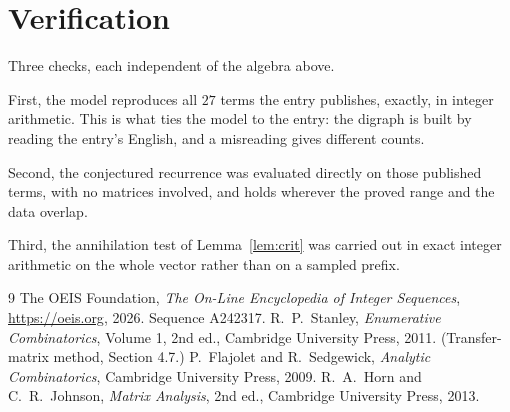 \documentclass[11pt,a4paper]{article}
\theoremstyle{plain}
\theoremstyle{definition}
\begin{document}
\section{Verification}

Three checks, each independent of the algebra above.

First, the model reproduces all $27$ terms the entry publishes, exactly, in integer
arithmetic. This is what ties the model to the entry: the digraph is built by reading the
entry's English, and a misreading gives different counts.

Second, the conjectured recurrence was evaluated directly on those published terms, with no
matrices involved, and holds wherever the proved range and the data overlap.

Third, the annihilation test of Lemma~\ref{lem:crit} was carried out in exact integer
arithmetic on the whole vector rather than on a sampled prefix.

\begin{thebibliography}{9}
 The OEIS Foundation, \emph{The On-Line Encyclopedia of Integer
Sequences}, \url{https://oeis.org}, 2026. Sequence A242317.
 R.~P.~Stanley, \emph{Enumerative Combinatorics}, Volume 1, 2nd ed.,
Cambridge University Press, 2011. (Transfer-matrix method, Section 4.7.)
 P.~Flajolet and R.~Sedgewick, \emph{Analytic Combinatorics}, Cambridge
University Press, 2009.
 R.~A.~Horn and C.~R.~Johnson, \emph{Matrix Analysis}, 2nd ed., Cambridge
University Press, 2013.
\end{thebibliography}
\end{document}
